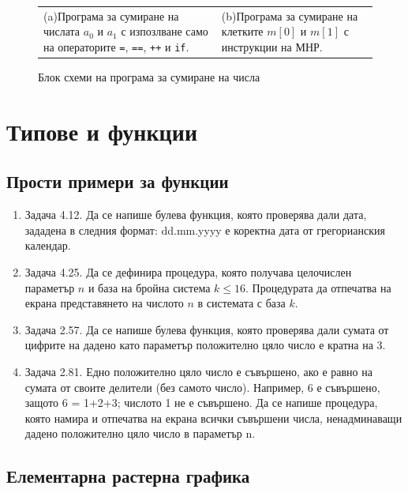 \documentclass[12pt,a4paper]{article}
\newcommand{\code}[1]{\texttt{#1}}
\begin{document}
{\begin{figure}
\begin{tabular}{p{7cm} p{7cm}}
      \\
      (a)Програма за сумиране на числата $a_0$ и $a_1$ с изпозлване само на операторите \code{=}, \code{==}, \code{++} и \code{if}.
      &
      (b)Програма за сумиране на клетките $m[0]$ и $m[1]$ с инструкции на МНР.
  \end{tabular}

  \caption{Блок схеми на програма за сумиране на числа}
  \label{fig:mnr}
\end{figure}




\pagebreak

\section {Типове и функции}

\subsection {Прости примери за функции}

\begin{enumerate}[resume]
	\item Задача 4.12.\cite{sbornik} Да се напише булева функция, която проверява дали дата, зададена в следния формат: dd.mm.yyyy е коректна дата от грегорианския календар.
	\item Задача 4.25.\cite{sbornik} Да се дефинира процедура, която получава целочислен параметър $n$ и база на бройна система $k \leq 16$. Процедурата да отпечатва на екрана представянето на числото $n$ в системата с база $k$.
	\item Задача 2.57.\cite{sbornik}	Да се напише булева функция, която проверява дали сумата от цифрите на дадено като параметър положително цяло число е кратна на 3.
	\item Задача 2.81.\cite{sbornik} Едно положително цяло число е съвършено, ако е равно на сумата от своите делители (без самото число). Например, 6 е съвършено, защото 6 = 1+2+3; числото 1 не е съвършено. Да се напише процедура, която намира и отпечатва на екрана  всички съвършени числа, ненадминаващи дадено положително цяло число в параметър n.

\end{enumerate}

\subsection {Елементарна растерна графика}

}
\end{document}
